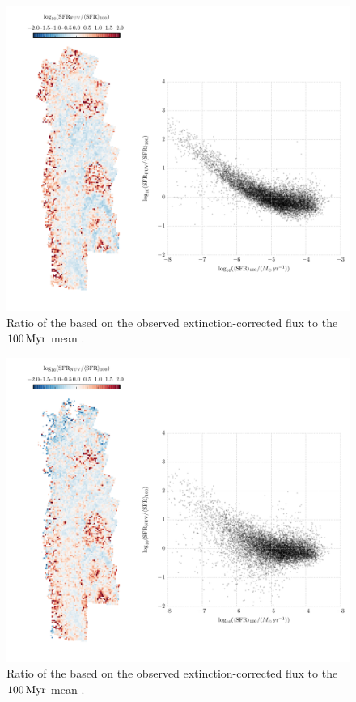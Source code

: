 \begin{figure}
\centering
\includegraphics[width=\textwidth]{m31flux-figures/sfr_fuv-vs-mean.pdf}
\caption[Ratio of the \sfr{} based on the observed extinction-corrected \fuv{}
    flux to the $100\myr$ mean \sfr{}.]{Ratio of the \sfr{} based on the
    observed extinction-corrected \fuv{} flux to the $100\myr$ mean \sfr{}.
}
\label{fig:mfx:fuvsfrratio}
\end{figure}


\begin{figure}
\centering
\includegraphics[width=\textwidth]{m31flux-figures/sfr_nuv-vs-mean.pdf}
\caption[Ratio of the \sfr{} based on the observed extinction-corrected \nuv{}
    flux to the $100\myr$ mean \sfr{}.]{Ratio of the \sfr{} based on the
    observed extinction-corrected \nuv{} flux to the $100\myr$ mean \sfr{}.
}
\label{fig:mfx:nuvsfrratio}
\end{figure}


